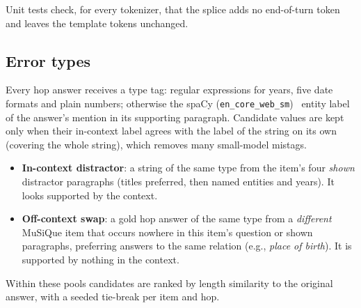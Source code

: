 \documentclass[conference]{IEEEtran}
\begin{document}
Unit tests check, for every tokenizer, that the splice adds no end-of-turn token and leaves the template tokens unchanged.

\subsection{Error types}
Every hop answer receives a type tag: regular expressions for years, five date formats and plain numbers; otherwise the spaCy (\texttt{en\_core\_web\_sm})~\cite{spacy} entity label of the answer's mention in its supporting paragraph. Candidate values are kept only when their in-context label agrees with the label of the string on its own (covering the whole string), which removes many small-model mistags.
\begin{itemize}
\item \textbf{In-context distractor}: a string of the same type from the item's four \emph{shown} distractor paragraphs (titles preferred, then named entities and years). It looks supported by the context.
\item \textbf{Off-context swap}: a gold hop answer of the same type from a \emph{different} MuSiQue item that occurs nowhere in this item's question or shown paragraphs, preferring answers to the same relation (e.g., \emph{place of birth}). It is supported by nothing in the context.
\end{itemize}
Within these pools candidates are ranked by length similarity to the original answer, with a seeded tie-break per item and hop.
\end{document}
